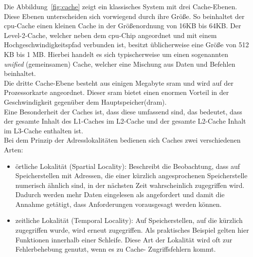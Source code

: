 Die Abbildung~\ref{fig:cache} zeigt ein klassisches System mit drei Cache-Ebenen. Diese Ebenen unterscheiden sich vorwiegend durch ihre Größe. So beinhaltet der \ac{cpu}-Cache einen kleinen Cache
in der Größenordnung von 16KB bis 64KB. Der Level-2-Cache, welcher neben dem \ac{cpu}-Chip angeordnet und mit einem Hochgeschwindigkeitspfad verbunden ist, besitzt üblicherweise eine Größe von
 512 KB bis 1 MB. Hierbei handelt es sich typischerweise um einen sogenannten \emph{unified} (gemeinsamen) Cache, welcher eine Mischung aus Daten und Befehlen beinhaltet. \\
 Die dritte Cache-Ebene besteht aus einigen Megabyte \ac{sram} und wird auf der Prozessorkarte angeordnet. Dieser \ac{sram} bietet einen enormen Vorteil in der Geschwindigkeit gegenüber dem
 Hauptspeicher(\ac{dram}). \\
 Eine Besonderheit der Caches ist, dass diese umfassend sind, das bedeutet, dass der gesamte Inhalt des L1-Caches im L2-Cache und der gesamte L2-Cache Inhalt im L3-Cache  enthalten ist.\\
 \newpage
Bei dem Prinzip der Adresslokalitäten bedienen sich Caches zwei verschiedenen Arten:\\

\begin{itemize}
  \item örtliche Lokalität (Spartial Locality): Beschreibt die Beobachtung, dass auf Speicherstellen mit 	Adressen, die einer kürzlich angesprochenen Speicherstelle numerisch ähnlich sind, in der
   	nächsten Zeit wahrscheinlich zugegriffen wird. Dadurch werden mehr Daten eingelesen als 	angefordert und damit die Annahme getätigt, dass Anforderungen vorausgesagt werden 	können.
  \item zeitliche Lokalität (Temporal Locality): Auf Speicherstellen, auf die kürzlich zugegriffen wurde, 	wird erneut zugegriffen.  Als praktisches Beispiel gelten hier Funktionen innerhalb
        einer Schleife. Diese Art der Lokalität wird oft zur Fehlerbehebung genutzt,  wenn es zu Cache-	Zugriffsfehlern kommt.\\
\end{itemize}

